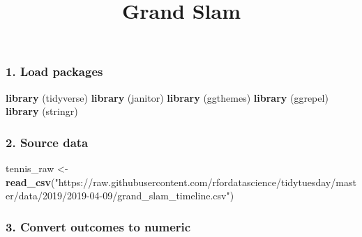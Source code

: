 \documentclass[]{article}
\title{Grand Slam}
\author{}
\date{}
\newenvironment{Shaded}{\begin{snugshade}}{\end{snugshade}}
\newcommand{\KeywordTok}[1]{\textcolor[rgb]{0.13,0.29,0.53}{\textbf{#1}}}
\newcommand{\StringTok}[1]{\textcolor[rgb]{0.31,0.60,0.02}{#1}}
\newcommand{\NormalTok}[1]{#1}
\begin{document}
\maketitle

\subsubsection{1. Load packages}\label{load-packages}

\begin{Shaded}
\begin{Highlighting}[]
\KeywordTok{library}\NormalTok{ (tidyverse)}
\KeywordTok{library}\NormalTok{ (janitor)}
\KeywordTok{library}\NormalTok{ (ggthemes)}
\KeywordTok{library}\NormalTok{ (ggrepel)}
\KeywordTok{library}\NormalTok{ (stringr)}
\end{Highlighting}
\end{Shaded}

\subsubsection{2. Source data}\label{source-data}

\begin{Shaded}
\begin{Highlighting}[]
\NormalTok{tennis_raw <-}\StringTok{ }\KeywordTok{read_csv}\NormalTok{(}\StringTok{"https://raw.githubusercontent.com/rfordatascience/tidytuesday/master/data/2019/2019-04-09/grand_slam_timeline.csv"}\NormalTok{)}
\end{Highlighting}
\end{Shaded}

\subsubsection{3. Convert outcomes to
numeric}\label{convert-outcomes-to-numeric}
\end{document}
